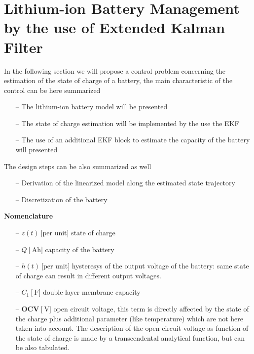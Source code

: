\documentclass[11pt,a4paper,oneside]{book}
\numberwithin{equation}{section}
\theoremstyle{it}
\theoremstyle{definition}
\begin{document}
\section{Lithium-ion Battery Management by the use of Extended Kalman Filter}
In the following section we will propose a control problem concerning the estimation of the state of charge of a battery, the main characteristic of the control can be here summarized
\begin{itemize}
	\item[--] The lithium-ion battery model will be presented
	\item[--] The state of charge estimation will be implemented by the use the EKF	
	\item[--] The use of an additional EKF block to estimate the capacity of the battery will presented
\end{itemize}
The design steps can be also summarized as well
\begin{itemize}
	\item[--] Derivation of the linearized model along the estimated state trajectory
	\item[--] Discretization of the battery
\end{itemize}

\vspace{5mm}
\noindent\textbf{Nomenclature}
\begin{itemize}
	\item[--] $z(t)\ \big[\text{per unit}\big]$ state of charge	
	\item[--] $Q\ \big[\SI{}{\ampere\hour}\big]$ capacity of the battery
	\item[--] $h(t)\ \big[\text{per unit}\big]$ hysteresys of the output
	voltage of the battery: same state of charge can result in different output 
	voltages. 
	\item[--] $C_1\ \big[\SI{}{\farad}\big]$ double layer membrane capacity
	\item[--] $\mathbf{OCV}\ \big[\SI{}{\volt}\big]$ open circuit voltage, 
	this term is directly affected by the state of the charge plus additional 
	parameter (like temperature) which are not here taken into account. The 
	description of the open circuit voltage as function of the state of charge 
	is made by a transcendental analytical function, but can be also tabulated.
\end{itemize}
\end{document}
